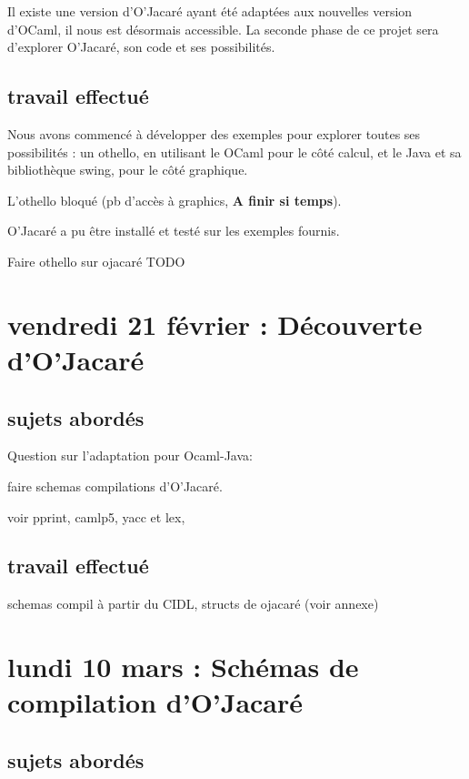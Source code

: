 \documentclass[a4paper, 11pt]{report}
\begin{document}
Il existe une version d'O'Jacaré ayant été adaptées aux nouvelles
version d'OCaml, il nous est désormais accessible.
La seconde phase de ce projet sera d'explorer O'Jacaré, son code et
ses possibilités.

\subsection{travail effectué}
Nous avons commencé à développer des exemples pour explorer toutes ses
possibilités : un othello, en utilisant le OCaml pour le côté calcul,
et le Java et sa bibliothèque swing, pour le côté graphique. 

L'othello bloqué (pb d'accès à graphics, \textbf{A finir si temps}).

O'Jacaré a pu être installé et testé sur les exemples fournis.

Faire othello sur ojacaré TODO




\section{vendredi 21 février : Découverte d'O'Jacaré}
\subsection{sujets abordés}

Question sur l'adaptation pour Ocaml-Java:



faire schemas compilations d'O'Jacaré.

voir pprint, camlp5, yacc et lex,  

\subsection{travail effectué}

schemas compil à partir du CIDL, structs de ojacaré (voir annexe)



\section{lundi 10 mars : Schémas de compilation d'O'Jacaré}
\subsection{sujets abordés}
\end{document}
